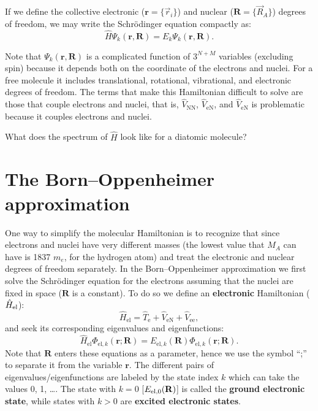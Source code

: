 \documentclass[../Main/chem532-notes.tex]{subfiles}
\begin{document}
If we define the collective electronic ($\mathbf{r} = \{ \vec{r}_i \}$) and nuclear ($\mathbf{R} = \{ \vec{R}_A \}$) degrees of freedom, we may write the Schr\"{o}dinger equation compactly as:
\begin{equation}
\hat{H} \Psi_k(\mathbf{r},\mathbf{R}) = E_k \Psi_k(\mathbf{r},\mathbf{R}).
\end{equation}

Note that $\Psi_k(\mathbf{r},\mathbf{R})$ is a complicated function of $3^{N+M}$ variables (excluding spin) because it depends both on the coordinate of the electrons and nuclei. For a free molecule it includes translational, rotational, vibrational, and electronic degrees of freedom.
The terms that make this Hamiltonian difficult to solve are those that couple electrons and nuclei, that is, $\hat{V}_\mathrm{NN}$, $\hat{V}_\mathrm{eN}$, and $\hat{V}_\mathrm{eN}$ is problematic because it couples electrons and nuclei.

\begin{problem}	
What does the spectrum of $\hat{H}$ look like for a diatomic molecule?
\end{problem}



\section{The Born--Oppenheimer approximation}
One way to simplify the molecular Hamiltonian is to recognize that since electrons and nuclei have very different masses (the lowest value that $M_A$ can have is 1837 $m_e$, for the hydrogen atom) and treat the electronic and nuclear degrees of freedom separately.
In the Born--Oppenheimer approximation we first solve the Schr\"{o}dinger equation for the electrons assuming that the nuclei are fixed in space ($\mathbf{R}$ is a constant).
To do so we define an \textbf{electronic} Hamiltonian ($\hat{H}_{\rm el}$):
\begin{equation}
\hat{H}_\mathrm{el} = \hat{T}_\mathrm{e} + \hat{V}_\mathrm{eN} + \hat{V}_\mathrm{ee},
\end{equation}
and seek its corresponding eigenvalues and eigenfunctions:
\begin{equation}
\hat{H}_\mathrm{el} \Phi_{\mathrm{el},k}(\mathbf{r};\mathbf{R})
= E_{\mathrm{el},k}(\mathbf{R}) \Phi_{\mathrm{el},k}(\mathbf{r};\mathbf{R}).
\end{equation}
Note that $\mathbf{R}$ enters these equations as a parameter, hence we use the symbol ``;'' to separate it from the variable $\mathbf{r}$. The different pairs of eigenvalues/eigenfunctions are labeled by the state index $k$ which can take the values 0, 1, \ldots. The state with $k = 0$ [$E_{{\rm el},0}(\mathbf{R})$] is called the \textbf{ground electronic state}, while states with $k > 0$ are \textbf{excited electronic states}.
\end{document}
